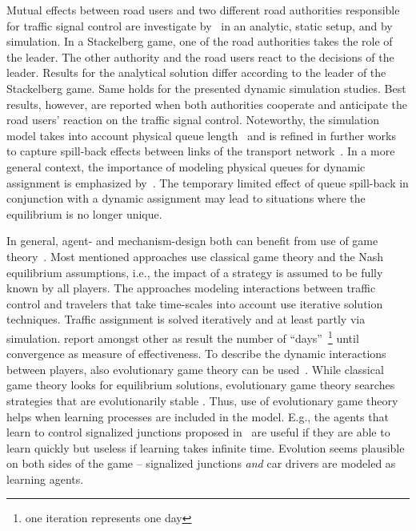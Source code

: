 Mutual effects between road users and two different road authorities responsible for traffic signal control are investigate by~\citet{VanZuylenTaale2004UrbanRingRoads} in an analytic, static setup, and by simulation.  
In a Stackelberg game, one of the road authorities takes the role of the leader. 
The other authority and the road users react to the decisions of the leader. 
Results for the analytical solution differ according to the leader of the Stackelberg game.  
Same holds for the presented dynamic simulation studies. 
Best results, however, are reported when both authorities cooperate and anticipate the road users' reaction on the traffic signal control. 
Noteworthy, the simulation model takes into account physical queue length~\citep{TaaleVanZuylen2003AnticipatoryTrafficControl} and is refined in further works to capture spill-back effects between links of the transport network~\citep{Taale2008Phd}. 
In a more general context, the importance of modeling physical queues for dynamic assignment is emphasized by~\citet{DaganzoAssign-w-queues}.  
The temporary limited effect of queue spill-back in conjunction with a dynamic assignment may lead to situations where the equilibrium is no longer unique.  


In general, agent- and mechanism-design both can benefit from use of game theory~\citep[][pp.~666]{RusselNorvig2010ArtificialIntelligence}. 
Most mentioned approaches use classical game theory and the Nash equilibrium assumptions, i.e., the impact of a strategy is assumed to be fully known by all players. 
The approaches modeling interactions between traffic control and travelers that take time-scales into account use iterative solution techniques. 
Traffic assignment is solved iteratively and at least partly via simulation. 
\citet{Hu1997D2DFlowEvolutionReactiveSignalsDynasmart} report amongst other as result the number of ``days''~\footnote{one iteration represents one day} until convergence as measure of effectiveness. 
To describe the dynamic interactions between players, also evolutionary game theory can be used~\citep[e.g.~][]{HofbSigmBook}. 
While classical game theory looks for equilibrium solutions, evolutionary game theory searches strategies that are evolutionarily stable \citep[p.~348]{Bazzan2009ReinforcementLearningPrint}. 
Thus, use of evolutionary game theory helps when learning processes are included in the model. 
E.g., the agents that learn to control signalized junctions proposed in~\citet{Bazzan2005signalAgents} are useful if they are able to learn quickly but useless if learning takes infinite time. 
Evolution seems plausible on both sides of the game -- \citet[e.g.~][]{BazzanEtc2008co-evolution-of-tr-lights-lncs} signalized junctions \emph{and} car drivers are modeled as learning agents. 

